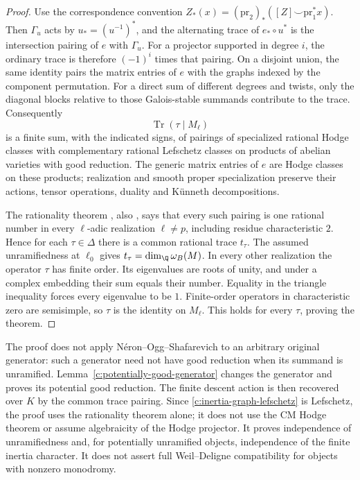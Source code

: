 \begin{proof}
Use the correspondence convention
$Z_*(x)=(\mathrm{pr}_2)_*([Z]\smile\mathrm{pr}_1^*x)$.
Then $\Gamma_u$ acts by $u_*=(u^{-1})^*$, and the alternating trace of
$e_*\circ u^*$ is the intersection pairing of $e$ with $\Gamma_u$.
For a projector supported in degree $i$, the ordinary trace is therefore
$(-1)^i$ times that pairing.  On a disjoint union, the same identity pairs
the matrix entries of $e$ with the graphs indexed by the component
permutation.  For a direct sum of different degrees and twists, only
the diagonal blocks relative to those Galois-stable summands contribute
to the trace.  Consequently
\[
 \operatorname{Tr}(\tau\mid M_\ell)
\]
is a finite sum, with the indicated signs, of pairings of specialized
rational Hodge classes with complementary rational Lefschetz classes on
products of abelian varieties with good reduction.  The generic matrix
entries of $e$ are Hodge classes on these products; realization and smooth
proper specialization preserve their actions, tensor operations, duality
and K\"unneth decompositions.

The rationality theorem \citep[Theorem 1.1]{c_rationality2026}, also
\citep[Theorem 1.1, pp.~1--2]{c_rationalityexposition2026}, says that every
such pairing is one rational number in every $\ell$-adic realization
$\ell\ne p$, including residue characteristic $2$.  Hence for each
$\tau\in\Delta$ there is a common rational trace $t_\tau$.
The assumed unramifiedness at $\ell_0$ gives
$t_\tau=\dim_\Q\omega_B(M)$.  In every other realization the operator
$\tau$ has finite order.  Its eigenvalues are roots of unity, and under a
complex embedding their sum equals their number.  Equality in the triangle
inequality forces every eigenvalue to be $1$.  Finite-order operators in
characteristic zero are semisimple, so $\tau$ is the identity on $M_\ell$.
This holds for every $\tau$, proving the theorem.
\end{proof}

\begin{remark}
The proof does not apply N\'eron--Ogg--Shafarevich to an arbitrary original
generator: such a generator need not have good reduction when its summand
is unramified.  Lemma~\ref{c:potentially-good-generator} changes the
generator and proves its potential good reduction.  The finite descent
action is then recovered over $K$ by the common trace pairing.  Since
\eqref{c:inertia-graph-lefschetz} is Lefschetz, the proof uses the
rationality theorem alone; it does not use the CM Hodge theorem or assume
algebraicity of the Hodge projector.  It proves independence of
unramifiedness and, for potentially unramified objects, independence of
the finite inertia character.  It does not assert full Weil--Deligne
compatibility for objects with nonzero monodromy.
\end{remark}
